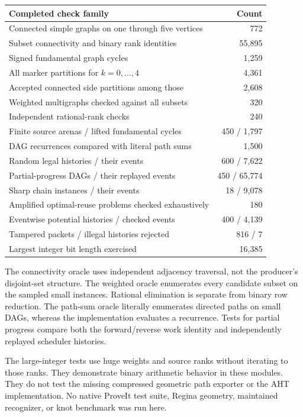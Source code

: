 \documentclass[11pt]{article}
\theoremstyle{definition}
\begin{document}
\begin{center}\small
\begin{tabular}{lr}
\toprule
Completed check family & Count\\
\midrule
Connected simple graphs on one through five vertices & 772\\
Subset connectivity and binary rank identities & 55,895\\
Signed fundamental graph cycles & 1,259\\
All marker partitions for $k=0,\ldots,4$ & 4,361\\
Accepted connected side partitions among those & 2,608\\
Weighted multigraphs checked against all subsets & 320\\
Independent rational-rank checks & 240\\
Finite source arenas / lifted fundamental cycles & 450 / 1,797\\
DAG recurrences compared with literal path sums & 1,500\\
Random legal histories / their events & 600 / 7,622\\
Partial-progress DAGs / their replayed events & 450 / 65,774\\
Sharp chain instances / their events & 18 / 9,078\\
Amplified optimal-reuse problems checked exhaustively & 180\\
Eventwise potential histories / checked events & 400 / 4,139\\
Tampered packets / illegal histories rejected & 816 / 7\\
Largest integer bit length exercised & 16,385\\
\bottomrule
\end{tabular}
\end{center}

The connectivity oracle uses independent adjacency traversal, not the producer's disjoint-set structure. The weighted oracle enumerates every candidate subset on the sampled small instances. Rational elimination is separate from binary row reduction. The path-sum oracle literally enumerates directed paths on small DAGs, whereas the implementation evaluates a recurrence. Tests for partial progress compare both the forward/reverse work identity and independently replayed scheduler histories.

The large-integer tests use huge weights and source ranks without iterating to those ranks. They demonstrate binary arithmetic behavior in these modules. They do not test the missing compressed geometric path exporter or the AHT implementation. No native ProveIt test suite, Regina geometry, maintained recognizer, or knot benchmark was run here.
\end{document}
